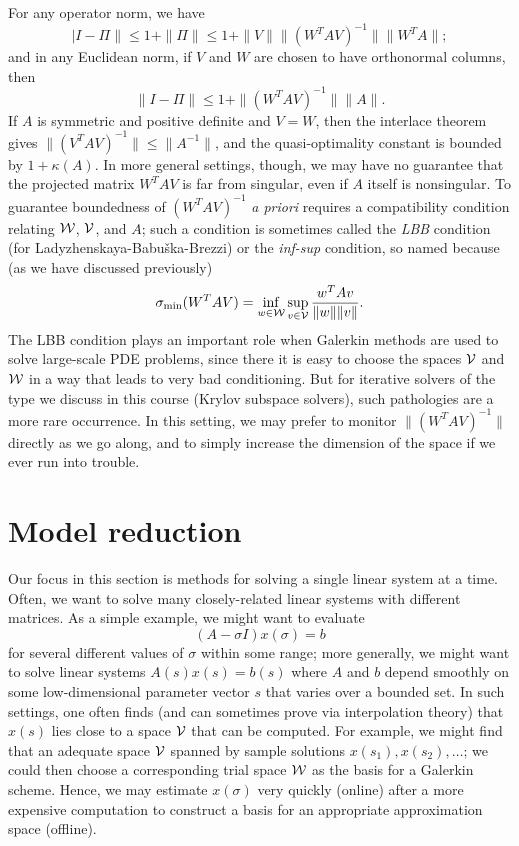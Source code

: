 \documentclass[12pt, leqno]{article} %
\begin{document}
For any operator norm, we have
\[
  |I-\Pi\| \leq 1+\|\Pi\| \leq 1 + \|V\| \|(W^T A V)^{-1}\| \|W^T A\|;
\]
and in any Euclidean norm, if $V$ and $W$ are chosen to have orthonormal
columns, then
\[
  \|I-\Pi\| \leq 1 + \|(W^T A V)^{-1}\| \|A\|.
\]
If $A$ is symmetric and positive definite and $V = W$, then the
interlace theorem gives $\|(V^T A V)^{-1}\| \leq \|A^{-1}\|$,
and the quasi-optimality constant is bounded by $1 + \kappa(A)$.
In more general settings, though, we may have no guarantee that
the projected matrix $W^T A V$ is far from singular, even if $A$
itself is nonsingular.  To guarantee boundedness of $(W^T A V)^{-1}$
{\em a priori} requires a compatibility condition relating
$\mathcal{W}$, $\mathcal{V}$, and $A$; such a condition is sometimes called
the {\em LBB} condition
(for Ladyzhenskaya-Babu\v{s}ka-Brezzi) or
the {\em inf-sup} condition, so named because (as we have discussed
previously)
\[
  \sigma_{\min}(W^T A V) =
  \inf_{w \in \mathcal{W}} \sup_{v \in \mathcal{V}} \frac{w^T A v}{\|w\| \|v\|}.
\]
The LBB condition plays an important role when Galerkin methods are
used to solve large-scale PDE problems, since there it is easy to
choose the spaces $\mathcal{V}$ and $\mathcal{W}$ in a way that leads to very
bad conditioning.  But for iterative solvers of the type we discuss
in this course (Krylov subspace solvers), such pathologies are a more
rare occurrence.  In this setting, we may prefer to
monitor $\|(W^T A V)^{-1}\|$ directly as we go along, and to simply
increase the dimension of the space if we ever run into trouble.

\section{Model reduction}

Our focus in this section is methods for solving a single linear
system at a time.  Often, we want to solve many closely-related
linear systems with different matrices.  As a simple example,
we might want to evaluate
\[
  (A-\sigma I) x(\sigma) = b
\]
for several different values of $\sigma$ within some range; more
generally, we might want to solve linear systems $A(s) x(s) = b(s)$
where $A$ and $b$ depend smoothly on some low-dimensional parameter
vector $s$ that varies over a bounded set.  In such settings, one often
finds (and can sometimes prove via interpolation theory) that $x(s)$
lies close to a space $\mathcal{V}$ that can be computed. For example, we
might find that an adequate space $\mathcal{V}$ spanned by sample solutions
$x(s_1), x(s_2), \ldots$; we could then choose a corresponding trial
space $\mathcal{W}$ as the basis for a Galerkin scheme.  Hence, we may
estimate $x(\sigma)$ very quickly (online) after a more expensive
computation to construct a basis for an appropriate approximation space
(offline).
\end{document}
